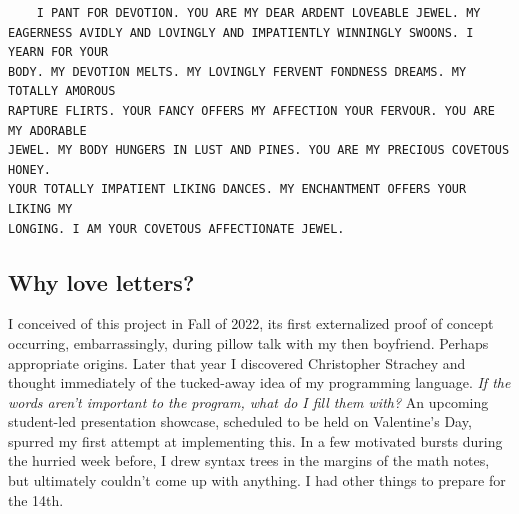 \documentclass[runningheads]{llncs}
\begin{document}
\begin{verbatim}
    I PANT FOR DEVOTION. YOU ARE MY DEAR ARDENT LOVEABLE JEWEL. MY
EAGERNESS AVIDLY AND LOVINGLY AND IMPATIENTLY WINNINGLY SWOONS. I YEARN FOR YOUR
BODY. MY DEVOTION MELTS. MY LOVINGLY FERVENT FONDNESS DREAMS. MY TOTALLY AMOROUS
RAPTURE FLIRTS. YOUR FANCY OFFERS MY AFFECTION YOUR FERVOUR. YOU ARE MY ADORABLE
JEWEL. MY BODY HUNGERS IN LUST AND PINES. YOU ARE MY PRECIOUS COVETOUS HONEY.
YOUR TOTALLY IMPATIENT LIKING DANCES. MY ENCHANTMENT OFFERS YOUR LIKING MY
LONGING. I AM YOUR COVETOUS AFFECTIONATE JEWEL.
\end{verbatim}
\subsection{Why love letters?}
I conceived of this project in Fall of 2022, its first externalized proof of concept occurring, embarrassingly, during pillow talk with my then boyfriend.%
Perhaps appropriate origins. Later that year I discovered Christopher Strachey and thought immediately of the tucked-away idea of my programming language. \textit{If the words aren't important to the program, what do I fill them with?} An upcoming student-led presentation showcase, scheduled to be held on Valentine's Day, spurred my first attempt at implementing this. In a few motivated bursts during the hurried week before, I drew syntax trees in the margins of the math notes, but ultimately couldn't come up with anything. I had other things to prepare for the 14th.
\end{document}
